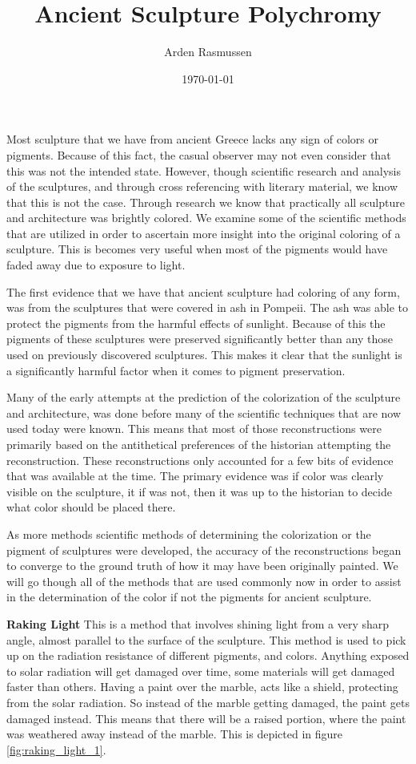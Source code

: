 \documentclass[10pt]{armath}
\title{Ancient Sculpture Polychromy}
\author{Arden Rasmussen}
\date{\today}
\begin{document}
\maketitle

Most sculpture that we have from ancient Greece lacks any sign of colors or
pigments. Because of this fact, the casual observer may not even consider that
this was not the intended state. However, though scientific research and
analysis of the sculptures, and through cross referencing with literary
material, we know that this is not the case. Through research we know that
practically all sculpture and architecture was brightly colored. We examine
some of the scientific methods that are utilized in order to ascertain more
insight into the original coloring of a sculpture. This is becomes very useful
when most of the pigments would have faded away due to exposure to light.

The first evidence that we have that ancient sculpture had coloring of any
form, was from the sculptures that were covered in ash in Pompeii. The ash was
able to protect the pigments from the harmful effects of sunlight. Because of
this the pigments of these sculptures were preserved significantly better than
any those used on previously discovered sculptures. This makes it clear that
the sunlight is a significantly harmful factor when it comes to pigment
preservation.

Many of the early attempts at the prediction of the colorization of the
sculpture and architecture, was done before many of the scientific techniques
that are now used today were known. This means that most of those
reconstructions were primarily based on the antithetical preferences of the
historian attempting the reconstruction. These reconstructions only accounted
for a few bits of evidence that was available at the time. The primary evidence
was if color was clearly visible on the sculpture, it if was not, then it was
up to the historian to decide what color should be placed there.

As more methods scientific methods of determining the colorization or the
pigment of sculptures were developed, the accuracy of the reconstructions began
to converge to the ground truth of how it may have been originally painted. We
will go though all of the methods that are used commonly now in order to assist
in the determination of the color if not the pigments for ancient sculpture.

\textbf{Raking Light} This is a method that involves shining light from a very
sharp angle, almost parallel to the surface of the sculpture. This method
is used to pick up on the radiation resistance of different pigments, and
colors. Anything exposed to solar radiation will get damaged over time,
some materials will get damaged faster than others. Having a paint over the
marble, acts like a shield, protecting from the solar radiation. So instead
of the marble getting damaged, the paint gets damaged instead. This means
that there will be a raised portion, where the paint was weathered away
instead of the marble. This is depicted in figure \ref{fig:raking_light_1}.
\end{document}
